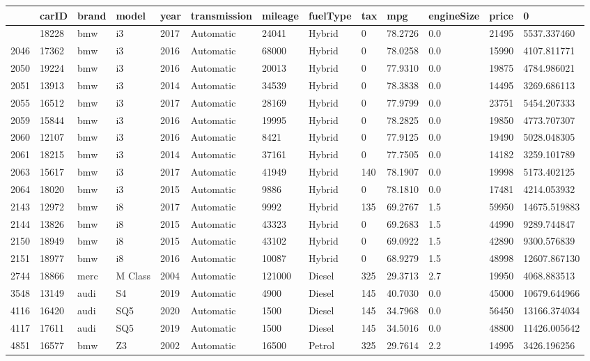 \documentclass[
  letterpaper,
  DIV=11,
  numbers=noendperiod]{scrreprt}
\begin{document}
\begin{longtable}[]{@{}lllllllllllll@{}}
\toprule\noalign{}
& carID & brand & model & year & transmission & mileage & fuelType & tax
& mpg & engineSize & price & 0 \\
\midrule\noalign{}
\endhead
\bottomrule\noalign{}
\endlastfoot
2042 & 18228 & bmw & i3 & 2017 & Automatic & 24041 & Hybrid & 0 &
78.2726 & 0.0 & 21495 & 5537.337460 \\
2046 & 17362 & bmw & i3 & 2016 & Automatic & 68000 & Hybrid & 0 &
78.0258 & 0.0 & 15990 & 4107.811771 \\
2050 & 19224 & bmw & i3 & 2016 & Automatic & 20013 & Hybrid & 0 &
77.9310 & 0.0 & 19875 & 4784.986021 \\
2051 & 13913 & bmw & i3 & 2014 & Automatic & 34539 & Hybrid & 0 &
78.3838 & 0.0 & 14495 & 3269.686113 \\
2055 & 16512 & bmw & i3 & 2017 & Automatic & 28169 & Hybrid & 0 &
77.9799 & 0.0 & 23751 & 5454.207333 \\
2059 & 15844 & bmw & i3 & 2016 & Automatic & 19995 & Hybrid & 0 &
78.2825 & 0.0 & 19850 & 4773.707307 \\
2060 & 12107 & bmw & i3 & 2016 & Automatic & 8421 & Hybrid & 0 & 77.9125
& 0.0 & 19490 & 5028.048305 \\
2061 & 18215 & bmw & i3 & 2014 & Automatic & 37161 & Hybrid & 0 &
77.7505 & 0.0 & 14182 & 3259.101789 \\
2063 & 15617 & bmw & i3 & 2017 & Automatic & 41949 & Hybrid & 140 &
78.1907 & 0.0 & 19998 & 5173.402125 \\
2064 & 18020 & bmw & i3 & 2015 & Automatic & 9886 & Hybrid & 0 & 78.1810
& 0.0 & 17481 & 4214.053932 \\
2143 & 12972 & bmw & i8 & 2017 & Automatic & 9992 & Hybrid & 135 &
69.2767 & 1.5 & 59950 & 14675.519883 \\
2144 & 13826 & bmw & i8 & 2015 & Automatic & 43323 & Hybrid & 0 &
69.2683 & 1.5 & 44990 & 9289.744847 \\
2150 & 18949 & bmw & i8 & 2015 & Automatic & 43102 & Hybrid & 0 &
69.0922 & 1.5 & 42890 & 9300.576839 \\
2151 & 18977 & bmw & i8 & 2016 & Automatic & 10087 & Hybrid & 0 &
68.9279 & 1.5 & 48998 & 12607.867130 \\
2744 & 18866 & merc & M Class & 2004 & Automatic & 121000 & Diesel & 325
& 29.3713 & 2.7 & 19950 & 4068.883513 \\
3548 & 13149 & audi & S4 & 2019 & Automatic & 4900 & Diesel & 145 &
40.7030 & 0.0 & 45000 & 10679.644966 \\
4116 & 16420 & audi & SQ5 & 2020 & Automatic & 1500 & Diesel & 145 &
34.7968 & 0.0 & 56450 & 13166.374034 \\
4117 & 17611 & audi & SQ5 & 2019 & Automatic & 1500 & Diesel & 145 &
34.5016 & 0.0 & 48800 & 11426.005642 \\
4851 & 16577 & bmw & Z3 & 2002 & Automatic & 16500 & Petrol & 325 &
29.7614 & 2.2 & 14995 & 3426.196256 \\
\end{longtable}
\end{document}
